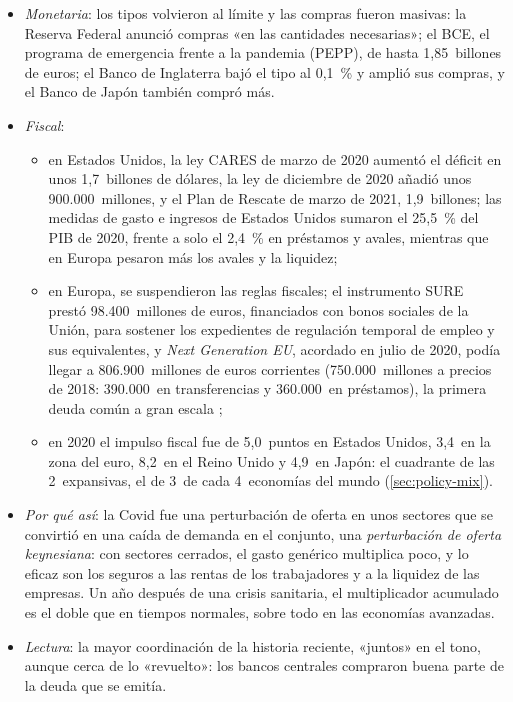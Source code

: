 \documentclass[11pt]{article}
\begin{document}
\begin{itemize}
\item \emph{Monetaria}: los tipos volvieron al límite y las compras fueron masivas: la Reserva Federal anunció compras «en las cantidades necesarias»\nocite{Fed2020Compras}; el BCE, el programa de emergencia frente a la pandemia (PEPP), de hasta 1,85~billones de euros\nocite{BCE2026PEPP}; el Banco de Inglaterra bajó el tipo al 0,1~\% y amplió sus compras, y el Banco de Japón también compró más.
\item \emph{Fiscal}:
  \begin{itemize}
  \item en Estados Unidos, la ley CARES de marzo de 2020 aumentó el déficit en unos 1,7~billones de dólares\nocite{CBO2020CARES}, la ley de diciembre de 2020 añadió unos 900.000~millones, y el Plan de Rescate de marzo de 2021, 1,9~billones; las medidas de gasto e ingresos de Estados Unidos sumaron el 25,5~\% del PIB de 2020, frente a solo el 2,4~\% en préstamos y avales, mientras que en Europa pesaron más los avales y la liquidez\nocite{FMI2021FMdatabase};
  \item en Europa, se suspendieron las reglas fiscales; el instrumento SURE prestó 98.400~millones de euros, financiados con bonos sociales de la Unión, para sostener los expedientes de regulación temporal de empleo y sus equivalentes\nocite{CE2026SURE}, y \emph{Next Generation EU}, acordado en julio de 2020, podía llegar a 806.900~millones de euros corrientes (750.000~millones a precios de 2018: 390.000~en transferencias y 360.000~en préstamos), la primera deuda común a gran escala\nocite{CE2026NGEU}  ;
  \item en 2020 el impulso fiscal fue de 5,0~puntos en Estados Unidos, 3,4~en la zona del euro, 8,2~en el Reino Unido y 4,9~en Japón\nocite{FMI2026FMdatos}: el cuadrante de las 2~expansivas, el de 3~de cada 4~economías del mundo (\ref{sec:policy-mix}).
  \end{itemize}
\item \emph{Por qué así}: la Covid fue una perturbación de oferta en unos sectores que se convirtió en una caída de demanda en el conjunto, una \emph{perturbación de oferta keynesiana}: con sectores cerrados, el gasto genérico multiplica poco, y lo eficaz son los seguros a las rentas de los trabajadores y a la liquidez de las empresas\nocite{GuerrieriEtAl2022}. Un año después de una crisis sanitaria, el multiplicador acumulado es el doble que en tiempos normales, sobre todo en las economías avanzadas\nocite{KindaLengyelChahande2022}.
\item \emph{Lectura}: la mayor coordinación de la historia reciente, «juntos» en el tono, aunque cerca de lo «revuelto»: los bancos centrales compraron buena parte de la deuda que se emitía.
\end{itemize}
\end{document}
